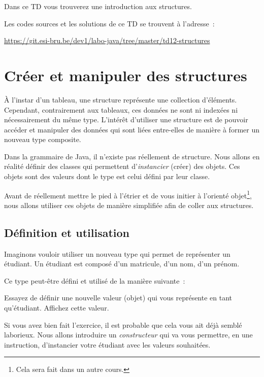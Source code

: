 \documentclass[a4paper,11pt]{article}
\date{2018 -- 2019}
\newcommand{\publicbasepath}{https://git.esi-bru.be/dev1/labo-java/tree/master/td12-structures}
\begin{document}
\entete
\titre
{}
\lastedit


	Dans ce TD vous trouverez une introduction aux structures.
	 
	Les codes sources et les solutions de ce TD se trouvent à l'adresse~: 
	
	\url{\publicbasepath}	


	\tableofcontents

	\newpage

\section{Créer et manipuler des structures}

	À l'instar d'un tableau, une structure représente une collection d'éléments. Cependant, contrairement aux tableaux, ces données ne sont ni indexées ni nécessairement du même type. L'intérêt d'utiliser une structure est de pouvoir accéder et manipuler des données qui sont liées entre-elles de manière à former un nouveau type composite.

	Dans la grammaire de Java, il n'existe pas réellement de structure. Nous allons en réalité définir des classes qui permettent d'\emph{instancier} (créer) des objets. Ces objets sont des valeurs dont le type est celui défini par leur classe.

	Avant de réellement mettre le pied à l'étrier et de vous initier à l'orienté objet\footnote{Cela sera fait dans un autre cours.}, nous allons utiliser ces objets de manière simplifiée afin de coller aux structures.


	\subsection{Définition et utilisation}

	Imaginons vouloir utiliser un nouveau type qui permet de représenter un étudiant. Un étudiant est composé d'un matricule, d'un nom, d'un prénom.

	Ce type peut-être défini et utilisé de la manière suivante~:


	Essayez de définir une nouvelle valeur (objet) qui vous représente en tant qu'étudiant. Affichez cette valeur.

	Si vous avez bien fait l'exercice, il est probable que cela vous ait déjà semblé laborieux. Nous allons introduire un \emph{constructeur} qui va vous permettre, en une instruction, d'instancier votre étudiant avec les valeurs souhaitées.
\end{document}
